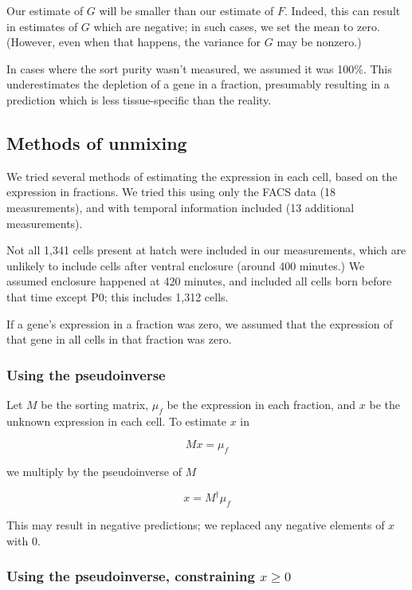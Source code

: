 \documentclass{article}
\begin{document}
Our estimate of $G$ will be smaller than our estimate of $F$.
Indeed, this can result in estimates of $G$ which are negative; in such
cases, we set the mean to zero. (However, even when that happens, the
variance for $G$ may be nonzero.)

In cases where the sort purity wasn't measured, we assumed it was 100\%.
This underestimates the depletion of a gene in a fraction,
presumably resulting in a prediction which is less tissue-specific than the
reality.

\newpage

\subsection*{Methods of unmixing}

We tried several methods of estimating the expression in each cell, based
on the expression in fractions. We tried this using only the FACS data
(18 measurements), and with temporal information included (13 additional
measurements).

Not all 1,341 cells present at hatch were included in our measurements,
which are unlikely to include cells after ventral enclosure (around 400 minutes.)
We assumed enclosure happened at 420 minutes, and included all cells born
before that time except P0; this includes 1,312 cells.

If a gene's expression in a fraction was zero, we assumed that the expression
of that gene in all cells in that fraction was zero.

\subsubsection*{Using the pseudoinverse}

Let $M$ be the sorting matrix, $\mu_f$ be the expression in each fraction, and
$x$ be the unknown expression in each cell. To estimate $x$ in

\[
Mx = \mu_f
\]

we multiply by the pseudoinverse of $M$

\[
x = M^\dagger \mu_f
\]

This may result in negative predictions; we replaced any negative elements
of $x$ with 0.

\subsubsection*{Using the pseudoinverse, constraining $x \ge 0$}
\end{document}
